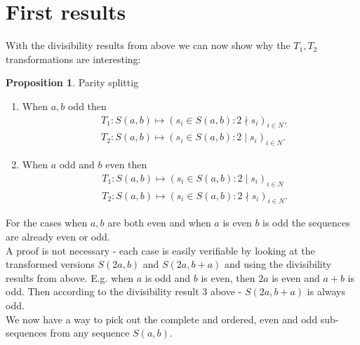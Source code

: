 \documentclass{article}
\theoremstyle{definition}
\newtheorem{proposition}{Proposition}[section]
\begin{document}
\section{First results}
With the divisibility results from above we can now show why the $T_1, T_2$ transformations are interesting:
\begin{proposition}\label{proposition:paritysplit}
Parity splittig
\begin{enumerate}
    \item When $a,b$ odd then
    \begin{equation*}
    \begin{split}
        & T_1: S(a,b) \longmapsto (s_i \in S(a,b): 2 \nmid s_i)_{i\in N}, \\
        & T_2: S(a,b) \longmapsto (s_i \in S(a,b): 2 \mid s_i)_{i\in N}.
    \end{split}
    \end{equation*}
    \item When $a$ odd and $b$ even then
    \begin{equation*}
    \begin{split}
        & T_1: S(a,b) \longmapsto (s_i \in S(a,b): 2 \mid s_i)_{i\in N} \\
        & T_2: S(a,b) \longmapsto (s_i \in S(a,b): 2 \nmid s_i)_{i\in N}.
    \end{split}
    \end{equation*}
\end{enumerate}
\end{proposition}
%
\noindent
For the cases when $a,b$ are both even and when $a$ is even $b$ is odd the sequences are already even or odd.
%
\\[.4cm]
%
A proof is not necessary - each case is easily verifiable by looking at the transformed versions $S(2a,b)$ and $S(2a,b+a)$ and using the divisibility results from above. E.g. when $a$ is odd and $b$ is even, then $2a$ is even and $a+b$ is odd. Then according to the divisibility result 3 above - $S(2a,b+a)$ is always odd.
%
\\[.4cm]
%
We now have a way to pick out the complete and ordered, even and odd sub-sequences from any sequence $S(a,b)$.
\end{document}
